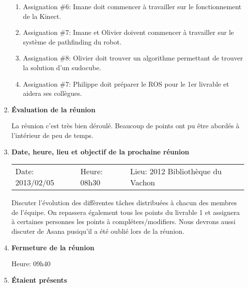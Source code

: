 \documentclass[12pt]{ULojpv}
\begin{document}
\begin{enumerate}
\begin{enumerate}
\item Assignation \#6: Imane doit commencer à travailler sur le fonctionnement de la Kinect.

\item Assignation \#7: Imane et Olivier doivent commencer à travailler sur le système de pathfinding du robot.

\item Assignation \#8: Olivier doit trouver un algorithme permettant de trouver la solution d'un sudocube.

\item Assignation \#7: Philippe doit préparer le ROS pour le 1er livrable et aidera ses collègues.

\end{enumerate}


\item \textbf{Évaluation de la réunion}

La réunion c'est très bien déroulé. Beaucoup de points ont pu être abordés à l'intérieur de peu de temps.

\item \textbf{Date, heure, lieu et objectif de la prochaine réunion}

\begin{tabular}{@{}lll}
   Date: 2013/02/05
   & Heure: 08h30
   &  Lieu: 2012 Bibliothèque du Vachon
\end{tabular}
\par
Discuter l'évolution des diffèrentes tâches distribuées à chacun des membres de l'équipe. On repassera également tous les points du livrable 1 et assignera à certaines personnes les points à compléters/modifiers. Nous devrons aussi discuter de Asana pusiqu'il a été oublié lors de la réunion.


\item \textbf{Fermeture de la réunion}

Heure: 09h40


\item \textbf{Étaient présents}


\end{enumerate}
\end{document}

